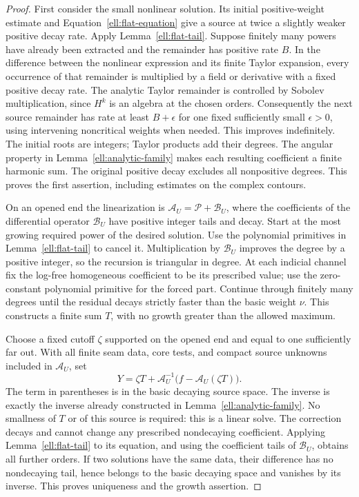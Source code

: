 \begin{proof}
First consider the small nonlinear solution.  Its initial
positive-weight estimate and
Equation~\eqref{ell:flat-equation} give a source at twice a
slightly weaker positive decay rate.  Apply
Lemma~\ref{ell:flat-tail}.  Suppose finitely many powers have
already been extracted and the remainder has positive rate $B$.
In the difference between the nonlinear expression and its
finite Taylor expansion, every occurrence of that remainder
is multiplied by a field or derivative with a fixed positive
decay rate.  The analytic Taylor remainder is controlled by
Sobolev multiplication, since $H^k$ is an algebra at the chosen
orders.  Consequently the next source remainder has rate at
least $B+\epsilon$ for one fixed sufficiently small
$\epsilon>0$, using intervening noncritical weights when needed.
This improves indefinitely.  The initial roots are integers;
Taylor products add their degrees.  The angular property in
Lemma~\ref{ell:analytic-family} makes each resulting coefficient
a finite harmonic sum.  The original positive decay excludes
all nonpositive degrees.  This proves the first assertion,
including estimates on the complex contours.

On an opened end the linearization is
$\mathcal A_U=\mathcal P+\mathcal B_U$, where the coefficients
of the differential operator $\mathcal B_U$ have positive
integer tails and decay.  Start at the most growing required
power of the desired solution.  Use the polynomial primitives
in Lemma~\ref{ell:flat-tail} to cancel it.  Multiplication by
$\mathcal B_U$ improves the degree by a positive integer, so
the recursion is triangular in degree.  At each indicial
channel fix the log-free homogeneous coefficient to be its
prescribed value; use the zero-constant polynomial primitive
for the forced part.  Continue through finitely many degrees
until the residual decays strictly faster than the basic
weight $\nu$.  This constructs a finite sum $T$, with no
growth greater than the allowed maximum.

Choose a fixed cutoff $\zeta$ supported on the opened end and
equal to one sufficiently far out.  With all finite seam data,
core tests, and compact source unknowns included in
$\mathcal A_U$, set
\begin{equation}
 Y=\zeta T+
       \mathcal A_U^{-1}\bigl(f-\mathcal A_U(\zeta T)\bigr).
 \label{ell:finite-growth-inverse}
\end{equation}
The term in parentheses is in the basic decaying source space.
The inverse is exactly the inverse already constructed in
Lemma~\ref{ell:analytic-family}.  No smallness of $T$ or of this
source is required: this is a linear solve.  The correction
decays and cannot change any prescribed nondecaying coefficient.
Applying Lemma~\ref{ell:flat-tail} to its equation, and using
the coefficient tails of $\mathcal B_U$, obtains all further
orders.  If two solutions have the same data, their difference
has no nondecaying tail, hence belongs to the basic decaying
space and vanishes by its inverse.  This proves uniqueness and
the growth assertion.


\end{proof}
